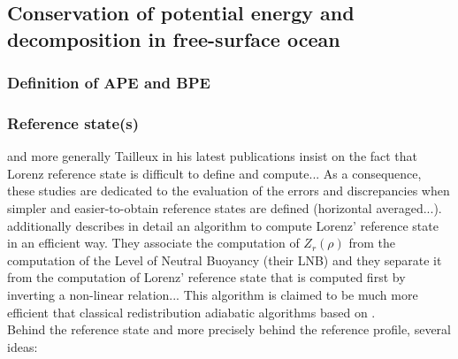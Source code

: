  \subsection{Conservation of potential energy and decomposition in free-surface ocean}
 
 \subsubsection{Definition of APE and BPE}
 
 
 
 \subsubsection{Reference state(s)}
 
\cite{saenz_estimating_2015} and more generally Tailleux in his latest publications \citep{tailleux_local_2018} insist on the fact that Lorenz reference state is difficult to define and compute... As a consequence, these studies are dedicated to the evaluation of the errors and discrepancies when simpler and easier-to-obtain reference states are defined (horizontal averaged...). \cite{saenz_estimating_2015} additionally describes in detail an algorithm to compute Lorenz' reference state in an efficient way. They associate the computation of $Z_r(\rho)$ from the computation of the Level of Neutral Buoyancy (their LNB) and they separate it from the computation of Lorenz' reference state that is computed first by inverting a non-linear relation... This algorithm is claimed to be much more efficient that classical redistribution adiabatic algorithms based on \citep{winters_available_1995}.\\
Behind the reference state and more precisely behind the reference profile, several ideas:
